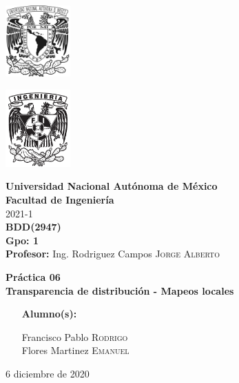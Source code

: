 \documentclass{article}
\newcommand{\materia}{BDD}
\newcommand{\clave}{2947}
\newcommand{\profesor}{Ing. Rodriguez Campos \textsc{Jorge Alberto}}
\newcommand{\semestre}{2021-1}
\newcommand{\alumno}{
    Francisco Pablo \textsc{Rodrigo}  \\ 
    Flores Martinez \textsc{Emanuel}   
}
\newcommand{\actividad}{Práctica 06}
\newcommand{\titulo}{Transparencia de distribución - Mapeos locales}
\newcommand{\fechaEntrega}{6 diciembre de 2020}
\begin{document}
\thispagestyle{empty}
\begin{minipage}[t][5cm][t]{0.2\linewidth}
    \includegraphics[width=2.5cm]{unam.jpg}
    \vspace{10cm}

    \includegraphics[width=2.5cm]{fiblack}
\end{minipage}
\begin{minipage}[t]{0.7\linewidth}
    \vspace{-2.5cm}
    \LARGE{\textbf{Universidad Nacional Autónoma de México}}\\
    \Large{\textbf{Facultad de Ingeniería}} \\

    \large{\semestre}\\[2cm]

    \large{\textbf{\materia (\clave)}}\\
    \large{\textbf{Gpo: 1}}\\[5mm]
    \large{\textbf{Profesor:} \profesor}\\ [1.5cm]
    \begin{center}
        \LARGE{\textbf{\actividad}}\\
        \LARGE{\textbf{\titulo}}\\
    \end{center}

    \vspace{3.3cm}

    \large{
        \begin{itemize}[
            noitemsep,
            align=left,
        ]
            \item [\textbf{Alumno(s):}] 
            \begin{flushright}
                \alumno
            \end{flushright}
        \end{itemize}
    } \vspace{1.5cm}

    \begin{flushright}
        \fechaEntrega%
    \end{flushright}
\end{minipage}
\end{document}
